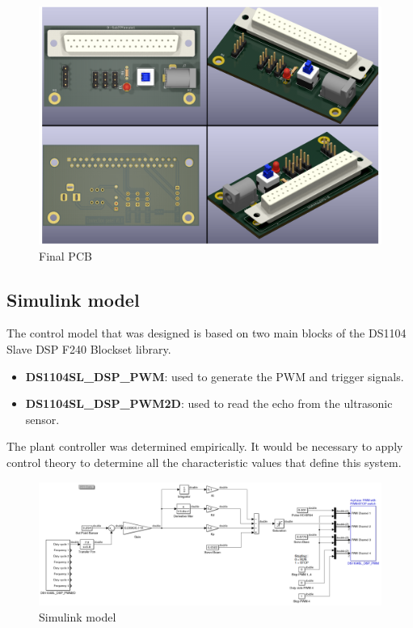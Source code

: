     \begin{figure}[H]
        \centering
        \includegraphics[width=\textwidth]{Images/Ball and Bean/Hardware/PCB.png}
        \caption{Final PCB}
        \label{fig43}
    \end{figure}

\subsection{Simulink model}
The control model that was designed is based on two main blocks of the DS1104 Slave DSP F240 Blockset library.
\begin{itemize}
    \item \textbf{DS1104SL\_DSP\_PWM}: used to generate the PWM and trigger signals.
    \item \textbf{DS1104SL\_DSP\_PWM2D}: used to read the echo from the ultrasonic sensor.
\end{itemize}
The plant controller was determined empirically. It would be necessary to apply control theory to determine all the characteristic values that define this system.
\begin{figure}[H]
    \centering
    \includegraphics[width=\textwidth]{Images/Ball and Bean/Similink/Simulink-Controller.png}
    \caption{Simulink model}
    \label{fig46}
\end{figure}
